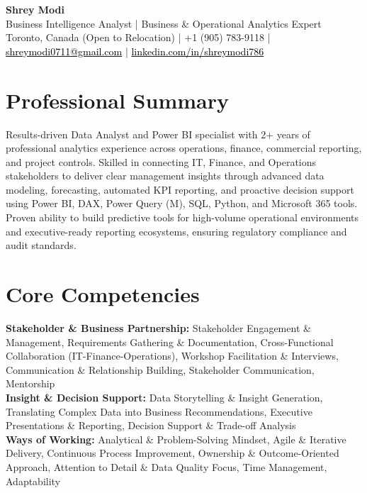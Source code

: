 \documentclass[10.5pt,letterpaper]{article}
\begin{document}
\begin{center}
  {\Huge \bfseries \color{accent} Shrey Modi}\\[0.3em]
  {\normalsize Business Intelligence Analyst | Business \& Operational Analytics Expert}\\[0.1em]
  {\small Toronto, Canada (Open to Relocation) | +1 (905) 783-9118 | \href{mailto:shreymodi0711@gmail.com}{\textcolor{black}{shreymodi0711@gmail.com}} | \href{https://linkedin.com/in/shreymodi786}{\textcolor{black}{linkedin.com/in/shreymodi786}}}
\end{center}
\vspace{-12pt}

\section{Professional Summary}
\noindent Results-driven Data Analyst and Power BI specialist with 2+ years of professional analytics experience across operations, finance, commercial reporting, and project controls. Skilled in connecting IT, Finance, and Operations stakeholders to deliver clear management insights through advanced data modeling, forecasting, automated KPI reporting, and proactive decision support using Power BI, DAX, Power Query (M), SQL, Python, and Microsoft 365 tools. Proven ability to build predictive tools for high-volume operational environments and executive-ready reporting ecosystems, ensuring regulatory compliance and audit standards.

\section{Core Competencies}
\noindent
\textbf{Stakeholder \& Business Partnership:} Stakeholder Engagement \& Management, Requirements Gathering \& Documentation, Cross-Functional Collaboration (IT-Finance-Operations), Workshop Facilitation \& Interviews, Communication \& Relationship Building, Stakeholder Communication, Mentorship\\\textbf{Insight \& Decision Support:} Data Storytelling \& Insight Generation, Translating Complex Data into Business Recommendations, Executive Presentations \& Reporting, Decision Support \& Trade-off Analysis\\\textbf{Ways of Working:} Analytical \& Problem-Solving Mindset, Agile \& Iterative Delivery, Continuous Process Improvement, Ownership \& Outcome-Oriented Approach, Attention to Detail \& Data Quality Focus, Time Management, Adaptability
\end{document}
